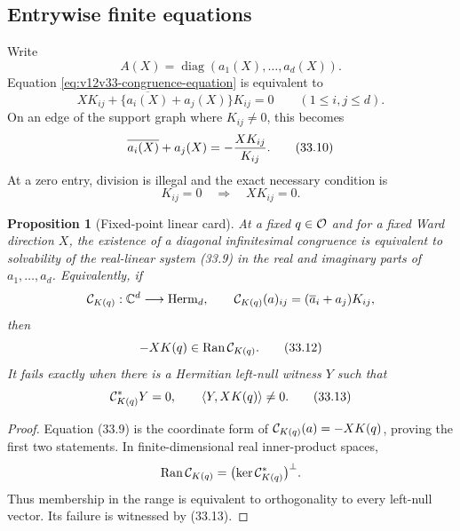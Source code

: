 \documentclass[11pt]{article}
\newtheorem{proposition}[theorem]{Proposition}
\theoremstyle{remark}
\begin{document}
\subsection{Entrywise finite equations}

Write
\[
 A(X)=\operatorname{diag}(a_1(X),\ldots,a_d(X)).
\]
Equation \eqref{eq:v12v33-congruence-equation} is equivalent to
\begin{equation}
 XK_{ij}
 +
 \{\overline{a_i(X)}+a_j(X)\}K_{ij}=0
 \qquad(1\leq i,j\leq d).                        \tag{33.9}
\end{equation}
On an edge of the support graph where \(K_{ij}\ne0\), this becomes
\begin{equation}
 \overline{a_i(X)}+a_j(X)
 =
 -{XK_{ij}\over K_{ij}}.                         \tag{33.10}
\end{equation}
At a zero entry, division is illegal and the exact necessary
condition is
\begin{equation}
                         K_{ij}=0
 \quad\Longrightarrow\quad XK_{ij}=0.            \tag{33.11}
\end{equation}

\begin{proposition}[Fixed-point linear card]
\label{prop:v12v33-linear-card}
At a fixed \(q\in{\cal O}\) and for a fixed Ward direction \(X\),
the existence of a diagonal infinitesimal congruence is equivalent
to solvability of the real-linear system (33.9) in the real and
imaginary parts of \(a_1,\ldots,a_d\).  Equivalently, if
\[
 {\cal C}_{K(q)}:
 \mathbb C^d\longrightarrow{\rm Herm}_d,\qquad
 {\cal C}_{K(q)}(a)_{ij}
 =
 (\overline a_i+a_j)K_{ij},
\]
then
\begin{equation}
                         -XK(q)\in
 \operatorname{Ran}{\cal C}_{K(q)}.              \tag{33.12}
\end{equation}
It fails exactly when there is a Hermitian left-null witness \(Y\)
such that
\begin{equation}
 {\cal C}_{K(q)}^*Y=0,\qquad
 \langle Y,XK(q)\rangle\ne0.                     \tag{33.13}
\end{equation}
\end{proposition}

\begin{proof}
Equation (33.9) is the coordinate form of
\({\cal C}_{K(q)}(a)=-XK(q)\), proving the first two statements.
In finite-dimensional real inner-product spaces,
\[
 \operatorname{Ran}{\cal C}_{K(q)}
 =
 \bigl(\ker{\cal C}_{K(q)}^*\bigr)^\perp.
\]
Thus membership in the range is equivalent to orthogonality to every
left-null vector.  Its failure is witnessed by (33.13).
\end{proof}
\end{document}
